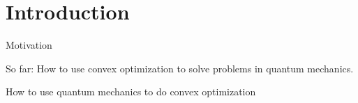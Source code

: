 \section*{Introduction}

\begin{frame}{Motivation}
 
\alert{So far:} How to use convex optimization to solve problems in quantum mechanics.

\vspace{4\floatsep}\pause

 How to use quantum mechanics to do convex optimization 

% 
% 

\end{frame}
